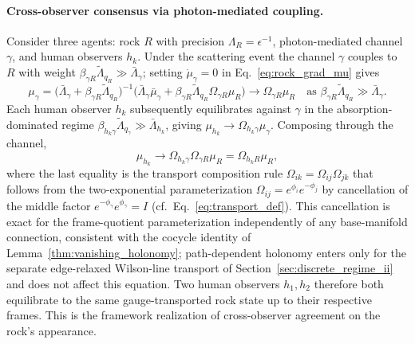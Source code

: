 \documentclass[11pt]{article}
\begin{document}
\paragraph{Cross-observer consensus via photon-mediated coupling.} Consider three agents: rock $R$ with precision $\Lambda_R = \epsilon^{-1}$, photon-mediated channel $\gamma$, and human observers $h_k$. Under the scattering event the channel $\gamma$ couples to $R$ with weight $\beta_{\gamma R}\tilde{\Lambda}_{q_R} \gg \bar{\Lambda}_\gamma$; setting $\dot{\mu}_\gamma = 0$ in Eq.~\eqref{eq:rock_grad_mu} gives
\begin{equation}
\mu_\gamma = \big(\bar{\Lambda}_\gamma + \beta_{\gamma R}\tilde{\Lambda}_{q_R}\big)^{-1}\big(\bar{\Lambda}_\gamma \bar{\mu}_\gamma + \beta_{\gamma R}\tilde{\Lambda}_{q_R}\Omega_{\gamma R}\mu_R\big) \to \Omega_{\gamma R} \mu_R \quad \text{as } \beta_{\gamma R}\tilde{\Lambda}_{q_R} \gg \bar{\Lambda}_\gamma.
\end{equation}
Each human observer $h_k$ subsequently equilibrates against $\gamma$ in the absorption-dominated regime $\beta_{h_k\gamma}\tilde{\Lambda}_{q_\gamma} \gg \bar{\Lambda}_{h_k}$, giving $\mu_{h_k} \to \Omega_{h_k\gamma}\mu_\gamma$. Composing through the channel,
\begin{equation}
\mu_{h_k} \to \Omega_{h_k\gamma} \Omega_{\gamma R} \mu_R = \Omega_{h_k R} \mu_R,
\label{eq:rock_consensus}
\end{equation}
where the last equality is the transport composition rule $\Omega_{ik} = \Omega_{ij}\Omega_{jk}$ that follows from the two-exponential parameterization $\Omega_{ij} = e^{\phi_i}e^{-\phi_j}$ by cancellation of the middle factor $e^{-\phi_\gamma}e^{\phi_\gamma} = I$ (cf.\ Eq.~\eqref{eq:transport_def}). This cancellation is exact for the frame-quotient parameterization independently of any base-manifold connection, consistent with the cocycle identity of Lemma~\ref{thm:vanishing_holonomy}; path-dependent holonomy enters only for the separate edge-relaxed Wilson-line transport of Section~\ref{sec:discrete_regime_ii} and does not affect this equation. Two human observers $h_1, h_2$ therefore both equilibrate to the same gauge-transported rock state up to their respective frames. This is the framework realization of cross-observer agreement on the rock's appearance.
\end{document}
